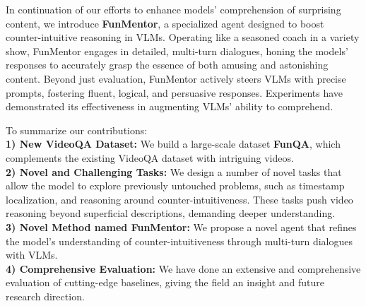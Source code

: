 \noindent In continuation of our efforts to enhance models' comprehension of surprising content, we introduce \textbf{FunMentor}, a specialized agent designed to boost counter-intuitive reasoning in VLMs. Operating like a seasoned coach in a variety show, FunMentor engages in detailed, multi-turn dialogues, honing the models' responses to accurately grasp the essence of both amusing and astonishing content. Beyond just evaluation, FunMentor actively steers VLMs with precise prompts, fostering fluent, logical, and persuasive responses. Experiments have demonstrated its effectiveness in augmenting VLMs' ability to comprehend.


\noindent To summarize our contributions:\\
\textbf{1) New VideoQA Dataset:} We build a large-scale dataset \textbf{FunQA}, which complements the existing VideoQA dataset with intriguing videos.\\
\textbf{2) Novel and Challenging Tasks:} We design a number of novel tasks that allow the model to explore previously untouched problems, such as timestamp localization, and reasoning around counter-intuitiveness. These tasks push video reasoning beyond superficial descriptions, demanding deeper understanding.\\
\textbf{3) Novel Method named FunMentor:} We propose a novel agent that refines the model's understanding of counter-intuitiveness through multi-turn dialogues with VLMs.\\
\textbf{4) Comprehensive Evaluation:} We have done an extensive and comprehensive evaluation of cutting-edge baselines, giving the field an insight and future research direction. 



